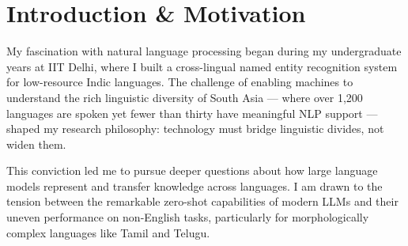   \section{Introduction \& Motivation}

  My fascination with natural language processing began during my undergraduate years at IIT Delhi, where I built a cross-lingual named entity recognition system for low-resource Indic languages. The challenge of enabling machines to understand the rich linguistic diversity of South Asia — where over 1,200 languages are spoken yet fewer than thirty have meaningful NLP support — shaped my research philosophy: technology must bridge linguistic divides, not widen them.

  This conviction led me to pursue deeper questions about how large language models represent and transfer knowledge across languages. I am drawn to the tension between the remarkable zero-shot capabilities of modern LLMs and their uneven performance on non-English tasks, particularly for morphologically complex languages like Tamil and Telugu.
